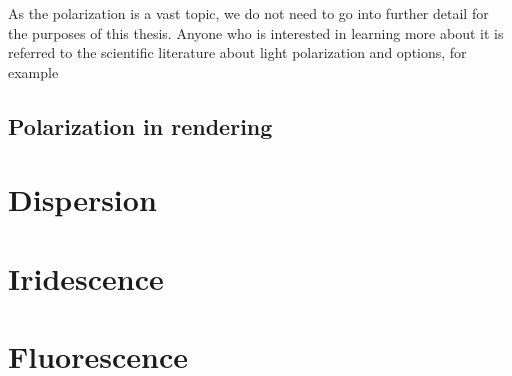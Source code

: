 As the polarization is a vast topic, we do not need to go into further detail for the purposes of this thesis. Anyone who is interested in learning more about it is referred to the scientific literature about light polarization and options, for example \citet{kliger2012polarized}

\subsection{Polarization in rendering}

\section{Dispersion}

\section{Iridescence}


\section{Fluorescence}